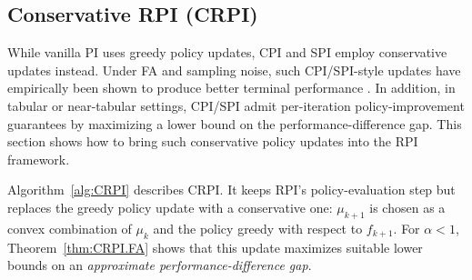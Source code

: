 \documentclass[twoside]{article}
\theoremstyle{plain}
\theoremstyle{definition}
\theoremstyle{remark}
\renewcommand{\sp}{\mathrm{sp}}
\newcommand{\tr}{\top}
\newcommand{\mub}{\bar{\mu}}
\newcommand{\alS}{\alpha^*}
\newcommand{\CRPI}{CRPI}
\renewcommand{\eqref}[1]{(\ref{#1})}
\begin{document}
\begin{algorithm}[t!]
\begin{algorithmic}
    \ENDFOR
\end{algorithmic}
\end{algorithm}



\subsection{Conservative RPI (\CRPI)}
\label{subsec:CRPI}
%
While vanilla PI uses greedy policy updates, CPI and SPI employ conservative updates instead. Under FA and sampling noise, such CPI/SPI-style updates have empirically been shown to produce better terminal performance \citep{metelli2021safe}. In addition, in tabular or near-tabular settings, CPI/SPI admit per-iteration policy-improvement guarantees by maximizing a lower bound on the performance-difference gap. This section shows how to bring such conservative policy updates into the RPI framework.

Algorithm~\ref{alg:CRPI} describes \CRPI. It keeps RPI’s policy-evaluation step but replaces the greedy policy update with a conservative one: $\mu_{k+1}$ is chosen as a convex combination of $\mu_k$ and the policy greedy with respect to $f_{k+1}$. For $\alpha<1$, Theorem~\ref{thm:CRPI.FA} shows that this update maximizes suitable lower bounds on an \textit{approximate performance-difference gap}.
\end{document}
